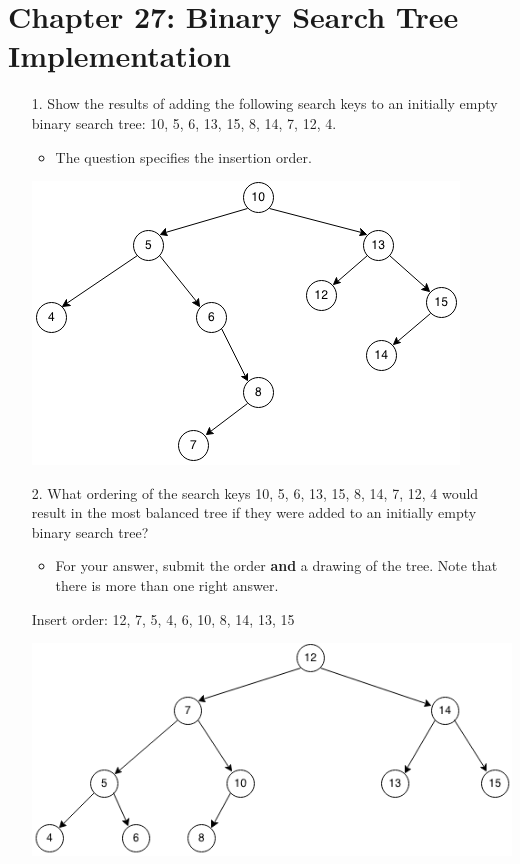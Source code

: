 \documentclass[10pt]{article}
\begin{document}
\section{Chapter 27: Binary Search Tree Implementation}

\begin{enumerate}
	\item[1.] Show the results of adding the following search keys to an initially empty binary search tree: 10, 5, 6, 13, 15, 8, 14, 7, 12, 4.
		\begin{itemize}
			\item The question specifies the insertion order.
		\end{itemize}
		
		\vspace{0.5cm}
		\includegraphics[scale=0.5]{images/27_1.png}
		\vspace{0.5cm}
	
	\item[2.] What ordering of the search keys 10, 5, 6, 13, 15, 8, 14, 7, 12, 4 would result in the most balanced tree if they were added to an initially empty binary search tree?
		\begin{itemize}
			\item For your answer, submit the order \textbf{and} a drawing of the tree. Note that there is more than one right answer.
		\end{itemize}
		
		\vspace{0.5cm}
		Insert order: 12, 7, 5, 4, 6, 10, 8, 14, 13, 15
		
		\vspace{0.5cm}
		\includegraphics[scale=0.5]{images/27_2.png}
		\vspace{0.5cm}
		

\end{enumerate}
\end{document}
